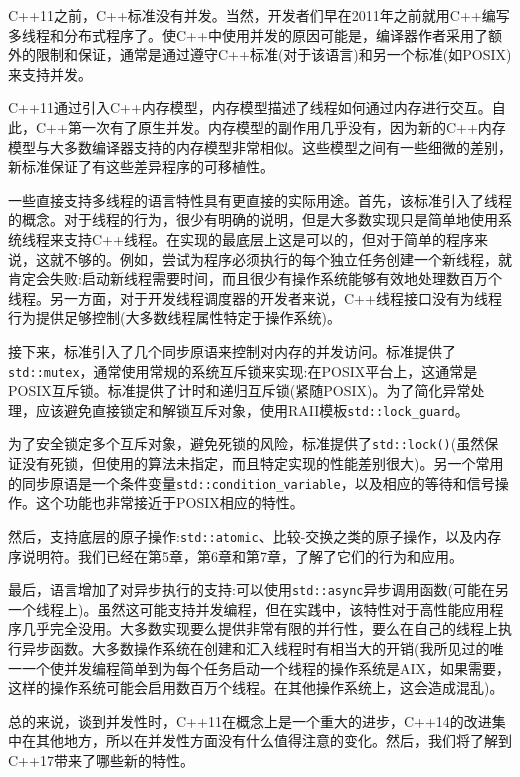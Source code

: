 C++11之前，C++标准没有并发。当然，开发者们早在2011年之前就用C++编写多线程和分布式程序了。使C++中使用并发的原因可能是，编译器作者采用了额外的限制和保证，通常是通过遵守C++标准(对于该语言)和另一个标准(如POSIX)来支持并发。

C++11通过引入C++内存模型，内存模型描述了线程如何通过内存进行交互。自此，C++第一次有了原生并发。内存模型的副作用几乎没有，因为新的C++内存模型与大多数编译器支持的内存模型非常相似。这些模型之间有一些细微的差别，新标准保证了有这些差异程序的可移植性。

一些直接支持多线程的语言特性具有更直接的实际用途。首先，该标准引入了线程的概念。对于线程的行为，很少有明确的说明，但是大多数实现只是简单地使用系统线程来支持C++线程。在实现的最底层上这是可以的，但对于简单的程序来说，这就不够的。例如，尝试为程序必须执行的每个独立任务创建一个新线程，就肯定会失败:启动新线程需要时间，而且很少有操作系统能够有效地处理数百万个线程。另一方面，对于开发线程调度器的开发者来说，C++线程接口没有为线程行为提供足够控制(大多数线程属性特定于操作系统)。

接下来，标准引入了几个同步原语来控制对内存的并发访问。标准提供了\texttt{std::mutex}，通常使用常规的系统互斥锁来实现:在POSIX平台上，这通常是POSIX互斥锁。标准提供了计时和递归互斥锁(紧随POSIX)。为了简化异常处理，应该避免直接锁定和解锁互斥对象，使用RAII模板\texttt{std::lock\_guard}。

为了安全锁定多个互斥对象，避免死锁的风险，标准提供了\texttt{std::lock()}(虽然保证没有死锁，但使用的算法未指定，而且特定实现的性能差别很大)。另一个常用的同步原语是一个条件变量\texttt{std::condition\_variable}，以及相应的等待和信号操作。这个功能也非常接近于POSIX相应的特性。

然后，支持底层的原子操作:\texttt{std::atomic}、比较-交换之类的原子操作，以及内存序说明符。我们已经在第5章，第6章和第7章，了解了它们的行为和应用。

最后，语言增加了对异步执行的支持:可以使用\texttt{std::async}异步调用函数(可能在另一个线程上)。虽然这可能支持并发编程，但在实践中，该特性对于高性能应用程序几乎完全没用。大多数实现要么提供非常有限的并行性，要么在自己的线程上执行异步函数。大多数操作系统在创建和汇入线程时有相当大的开销(我所见过的唯一一个使并发编程简单到为每个任务启动一个线程的操作系统是AIX，如果需要，这样的操作系统可能会启用数百万个线程。在其他操作系统上，这会造成混乱)。

总的来说，谈到并发性时，C++11在概念上是一个重大的进步，C++14的改进集中在其他地方，所以在并发性方面没有什么值得注意的变化。然后，我们将了解到C++17带来了哪些新的特性。




































